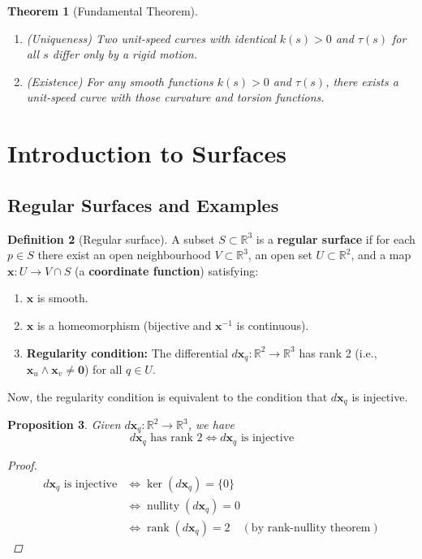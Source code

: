\documentclass[10pt, a4paper]{article}
\newcommand{\R}{\mathbb{R}}
\newcommand{\op}[1]{\operatorname{#1}}
\theoremstyle{plain}
\newtheorem{theorem}{Theorem}[section]
\newtheorem{proposition}[theorem]{Proposition}
\theoremstyle{definition}
\newtheorem{definition}[theorem]{Definition}
\theoremstyle{remark}
\begin{document}
\begin{theorem}[Fundamental Theorem]
  \hfill
  \begin{enumerate}
    \item \emph{(Uniqueness)} Two unit-speed curves with identical $k(s)>0$ and $\tau(s)$ for all $s$ differ only by a rigid motion.
    \item \emph{(Existence)} For any smooth functions $k(s)>0$ and $\tau(s)$, there exists a unit-speed curve with those curvature and torsion functions.
  \end{enumerate}
\end{theorem}


\pagebreak
\section{Introduction to Surfaces}

\subsection{Regular Surfaces and Examples}

\begin{definition}[Regular surface]
  A subset $S\subset\mathbb{R}^3$ is a \textbf{regular surface} if for each $p\in S$ there exist an open neighbourhood $V \subset \mathbb{R}^3$, an open set $U\subset\mathbb{R}^2$, and a map $\mathbf{x}:U\to V \cap S$ (a \textbf{coordinate function}) satisfying:
  \begin{enumerate}
    \item $\mathbf{x}$ is smooth.
    \item $\mathbf{x}$ is a homeomorphism (bijective and $\mathbf{x}^{-1}$ is continuous).
    \item \textbf{Regularity condition:} The differential $d\mathbf{x}_q:\mathbb{R}^2\to\mathbb{R}^3$ has rank 2 (i.e., $\mathbf{x}_u\wedge\mathbf{x}_v\neq\mathbf{0}$) for all $q \in U$.
  \end{enumerate}
\end{definition}

Now, the regularity condition is equivalent to the condition that $d\textbf{x}_q$ is injective.

\begin{proposition}
    Given $d\textbf{x}_q :\R^2 \to \R^3$, we have
    $$d\textbf{x}_q \text{ has rank 2} \iff d\textbf{x}_q \text{ is injective}$$
    \begin{proof}
        \begin{align*}
            d\textbf{x}_q \text{ is injective} &\iff \ker(d\textbf{x}_q) =\{0\}\\
            &\iff \op{nullity}(d\textbf{x}_q) =0\\
            &\iff \op{rank}(d\textbf{x}_q) =2 \quad (\text{by rank-nullity theorem})
        \end{align*}
    \end{proof}
\end{proposition}
\end{document}
